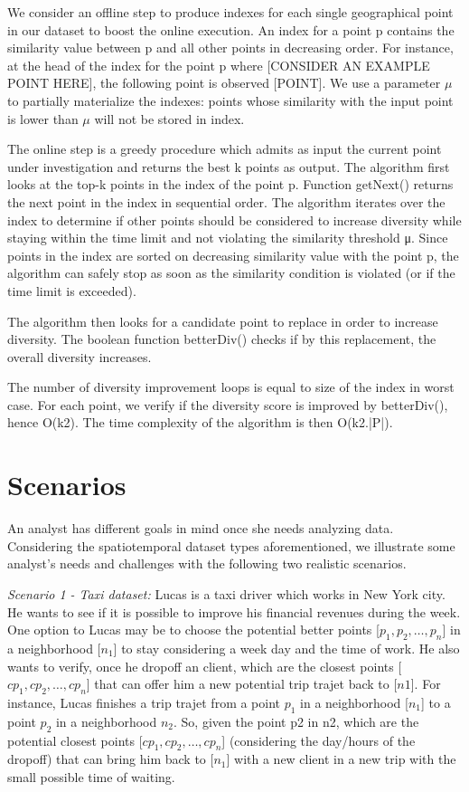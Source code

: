 \documentclass{sig-alternate-05-2015}
\begin{document}
We consider an offline step to produce indexes for each single geographical
point in our dataset to boost the online execution. An index for a point p
contains the similarity value between p and all other points in decreasing
order. For instance, at the head of the index for the point p where [CONSIDER AN
EXAMPLE POINT HERE], the following point is observed [POINT]. We use a parameter
$\mu$  to partially materialize the indexes: points whose similarity with the
 input point is lower than $\mu$ will not be stored in index.        

The online step is a greedy procedure which admits as input the current point
under investigation and returns the best k points as output. The algorithm first
looks at the top-k points in the index of the point p. Function getNext()
returns the next point in the index in sequential order. The algorithm iterates
over the index to determine if other points should be considered to increase
diversity while staying within the time limit and not violating the similarity
threshold μ. Since points in the index are sorted on decreasing similarity value
with the point p, the algorithm can safely stop as soon as the similarity
condition is violated (or if the time limit is exceeded).        

The algorithm then looks for a candidate point to replace in order to increase
diversity. The boolean function betterDiv() checks if by this replacement, the
overall diversity increases.    

The number of diversity improvement loops is equal to size of the index in worst
case. For each point, we verify if the diversity score is improved by
betterDiv(), hence O(k2). The time complexity of the algorithm is then
O(k2.|P|).     

\section{Scenarios}\label{sec:scenarios}

An analyst has different goals in mind once she needs analyzing data.
Considering the spatiotemporal dataset types aforementioned, we illustrate some
analyst's needs and challenges with the following two realistic scenarios.   
\bigskip

\textit{Scenario 1 - Taxi dataset:} Lucas is a taxi driver which works in New
York city. He wants to see if it is possible to improve his financial revenues
during the week. One option to Lucas may be to choose the potential better
points [$p_1, p_2, \ldots, p_n $] in a neighborhood [$n_1$] to stay considering
a week day and the time of work. He also wants to verify, once he dropoff an
client, which are the closest points [$cp_1, cp_2, \ldots, cp_n $] that can
offer him a new potential trip trajet back to [$n1$]. For instance, Lucas
finishes a trip trajet from a point $p_1$ in a neighborhood [$n_1$] to a point
$p_2$ in a neighborhood $n_2$.  So, given the point p2 in n2, which are the
potential closest points [$cp_1, cp_2, \ldots, cp_n $] (considering the
day/hours of the dropoff) that can bring him back to [$n_1$] with a new client
in a new trip with the small possible time of waiting.
\bigskip
\end{document}

